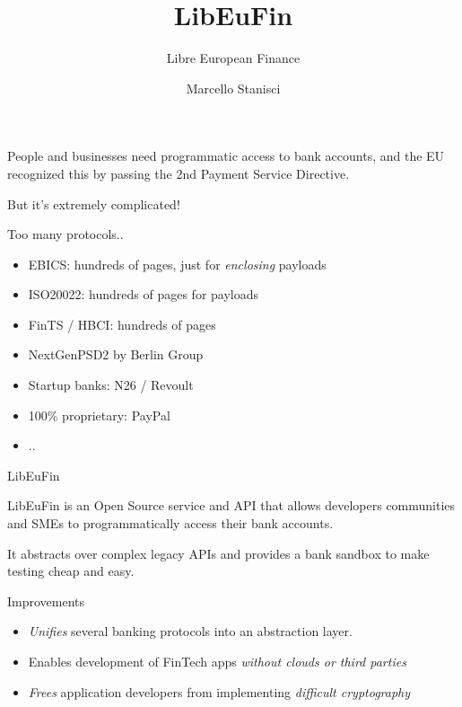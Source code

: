 \documentclass[pdf]{beamer}
\title{LibEuFin}
\subtitle{Libre European Finance}
\author{Marcello Stanisci}
\begin{document}

\begin{frame}
  \titlepage
\end{frame}

\begin{frame}
  \begin{center}
  People and businesses need programmatic access to bank accounts, and
  the EU recognized this by passing the 2nd Payment Service Directive.

  But it's extremely complicated!
  \end{center}
\end{frame}

\begin{frame}{Too many protocols..}
  \begin{itemize}
    \item EBICS: hundreds of pages, just for {\it enclosing} payloads
    \item ISO20022: hundreds of pages for payloads
    \item FinTS / HBCI: hundreds of pages
    \item NextGenPSD2 by Berlin Group 
    \item Startup banks: N26 / Revoult
    \item 100\% proprietary: PayPal
    \item ..
  \end{itemize}
\end{frame}

\begin{frame}{LibEuFin}
  \begin{center}
  LibEuFin is an Open Source service and API that allows developers
  communities and SMEs to programmatically access their bank accounts.

  It abstracts over complex legacy APIs and provides a bank sandbox
  to make testing cheap and easy.
  \end{center}
\end{frame}

\begin{frame}{Improvements}
  \begin{itemize}
  \item {\it Unifies} several banking protocols into an abstraction layer.
  \item Enables development of FinTech apps {\it without clouds or third parties}
  \item {\it Frees} application developers from implementing {\it difficult cryptography}
  \end{itemize}
\end{frame}
\end{document}
